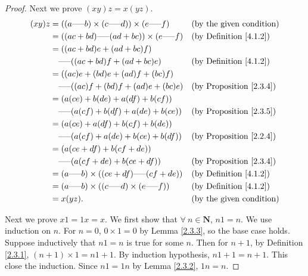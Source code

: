 \begin{proof}
Next we prove \((xy)z = x(yz)\).
\begin{align*}
(xy)z &= ((a \text{-----} b) \times (c \text{-----} d)) \times (e \text{-----} f) && \text{(by the given condition)} \\
&= ((ac + bd) \text{-----} (ad + bc)) \times (e \text{-----} f) && \text{(by Definition \ref{4.1.2})} \\
&= ((ac + bd)e + (ad + bc)f) \\
&\quad \text{-----} ((ac + bd)f + (ad + bc)e) && \text{(by Definition \ref{4.1.2})} \\
&= ((ac)e + (bd)e + (ad)f + (bc)f) \\
&\quad \text{-----} ((ac)f + (bd)f + (ad)e + (bc)e) && \text{(by Proposition \ref{2.3.4})} \\
&= (a(ce) + b(de) + a(df) + b(cf)) \\
&\quad \text{-----} (a(cf) + b(df) + a(de) + b(ce)) && \text{(by Proposition \ref{2.3.5})} \\
&= (a(ce) + a(df) + b(cf) + b(de)) \\
&\quad \text{-----} (a(cf) + a(de) + b(ce) + b(df)) && \text{(by Proposition \ref{2.2.4})} \\
&= (a(ce + df) + b(cf + de)) \\
&\quad \text{-----} (a(cf + de) + b(ce + df)) && \text{(by Proposition \ref{2.3.4})} \\
&= (a \text{-----} b) \times ((ce + df) \text{-----} (cf + de)) && \text{(by Definition \ref{4.1.2})} \\
&= (a \text{-----} b) \times ((c \text{-----} d) \times (e \text{-----} f)) && \text{(by Definition \ref{4.1.2})} \\
&= x(yz). && \text{(by the given condition)}
\end{align*}

Next we prove \(x1 = 1x = x\).
We first show that \(\forall\ n \in \mathbf{N}\), \(n1 = n\).
We use induction on \(n\).
For \(n=0\), \(0 \times 1 = 0\) by Lemma \ref{2.3.3}, so the base case holds.
Suppose inductively that \(n1 = n\) is true for some \(n\).
Then for \(n + 1\), by Definition \ref{2.3.1}, \((n + 1) \times 1 = n1 + 1\).
By induction hypothesis, \(n1 + 1 = n + 1\).
This close the induction.
Since \(n1 = 1n\) by Lemma \ref{2.3.2}, \(1n = n\).


\end{proof}
